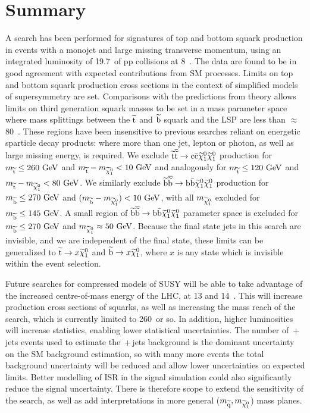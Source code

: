 \section{Summary}
A search has been performed for signatures of top and bottom squark production in events with a monojet and large missing transverse momentum, using an integrated luminosity of 19.7~\fbinv of pp collisions at 8~\TeV. 
The data are found to be in good agreement with expected contributions from \ac{SM} processes.  
Limits on top and bottom squark production cross sections in the context of simplified models of supersymmetry are set. 
Comparisons with the predictions from theory allows limits on third generation squark masses to be set in a mass parameter space where mass splittings between the $\widetilde{{\rm t}}$ and $\widetilde{{\rm b}}$ squark and the LSP are less than $\approx$ 80~\GeV.
These regions have been insensitive to previous searches reliant on energetic sparticle decay products: where more than one jet, lepton or photon, as well as large missing energy, is required.  
We exclude $\widetilde{{\rm t}} \overline{\widetilde{\mathrm{t}}} \rightarrow \rm c \bar{\rm c} \widetilde{\chi}^{0}_{1} \widetilde{\chi}^{0}_{1}$ 
production for $m_{\widetilde{{\rm t}}} \leq 260~\mathrm{GeV}$ and
$m_{\widetilde{{\rm t}}} - m_{\widetilde{\chi}^{0}_{1}} <10~\mathrm{GeV}$ 
and analogously for $m_{\widetilde{{\rm t}}} \leq 120~\mathrm{GeV}$ and
$m_{\widetilde{{\rm t}}} - m_{\widetilde{\chi}^{0}_{1}} <80~\mathrm{GeV}$.
We similarly exclude $\widetilde{{\rm b}} \overline{\widetilde{\mathrm{b}}} \rightarrow \rm b \bar{\rm b} \widetilde{\chi}^{0}_{1} \widetilde{\chi}^{0}_{1}$ production for $m_{\widetilde{{\rm b}}} \leq 270~\mathrm{GeV}$ and 
$(m_{\widetilde{{\rm b}}} - m_{\widetilde{\chi}^{0}_{1}}) <10~\mathrm{GeV}$, with all $m_{\widetilde{\chi}^{0}_{1}}$ excluded for $m_{\widetilde{{\rm b}}} \leq 145~\mathrm{GeV}$.
A small region of $\widetilde{{\rm b}} \overline{\widetilde{\mathrm{b}}} \rightarrow \rm b \bar{\rm b} \widetilde{\chi}^{0}_{1} \widetilde{\chi}^{0}_{1}$ parameter space is excluded for $m_{\widetilde{{\rm b}}} \leq 270~\mathrm{GeV}$ and $m_{\widetilde{\chi}^{0}_{1}} \approx 50~\mathrm{GeV}$.
Because the final state jets in this search are invisible, and we are independent of the final state, these limits can be generalized to $\widetilde{{\rm t}} \rightarrow x \widetilde{\chi}^{0}_{1}$ and $\widetilde{{\rm b}} \rightarrow x \widetilde{\chi}^{0}_{1}$, where $x$ is any state which is invisible within the event selection.


Future searches for compressed models of \ac{SUSY} will be able to take advantage of the increased centre-of-mass energy of the \ac{LHC}, at 13 and 14~\TeV{}. 
This will increase production cross sections of squarks, as well as increasing the mass reach of the search, which is currently limited to 260~\GeV or so. 
In addition, higher luminosities will increase statistics, enabling lower statistical uncertainties. 
The number of \zmumubr{}\,+\,jets events used to estimate the \znunubr{}\,+\,jets background is the dominant uncertainty on the \ac{SM} background estimation, so with many more events the total background uncertainty will be reduced and allow lower uncertainties on expected limits. 
Better modelling of \ac{ISR} in the signal simulation could also significantly reduce the signal uncertainty. 
There is therefore scope to extend the sensitivity of the search, as well as add interpretations in more general ($m_{\widetilde{{\rm q}}}, m_{\widetilde{\chi}^{0}_{1}}$) mass planes. 


